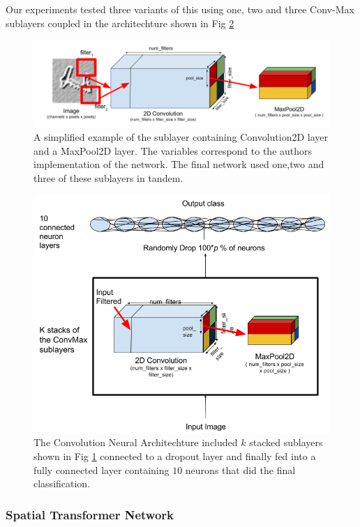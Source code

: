\documentclass[conference]{IEEEtran}
\begin{document}
Our experiments tested three variants of this using one, two and three Conv-Max sublayers coupled in the architechture shown in Fig \ref{CNNarch}

\begin{figure}[h]
	\includegraphics[scale=0.30]{convnet_example.png}
	\caption{A simplified example of the sublayer containing Convolution2D layer and a MaxPool2D layer. The variables correspond to the authors implementation of the network. The final network used one,two and three of these sublayers in tandem.}
	\label{convmaxlayer}
\end{figure}


\begin{figure}[h]
	\centering
	\includegraphics[scale=0.40]{architecture.png}
	\caption{The Convolution Neural Architechture included $k$ stacked sublayers shown in Fig \ref{convmaxlayer} connected to a dropout layer and finally fed into a fully connected layer containing $10$ neurons that did the final classification.}
	\label{CNNarch}
\end{figure}

\subsubsection{Spatial Transformer Network}
\end{document}
